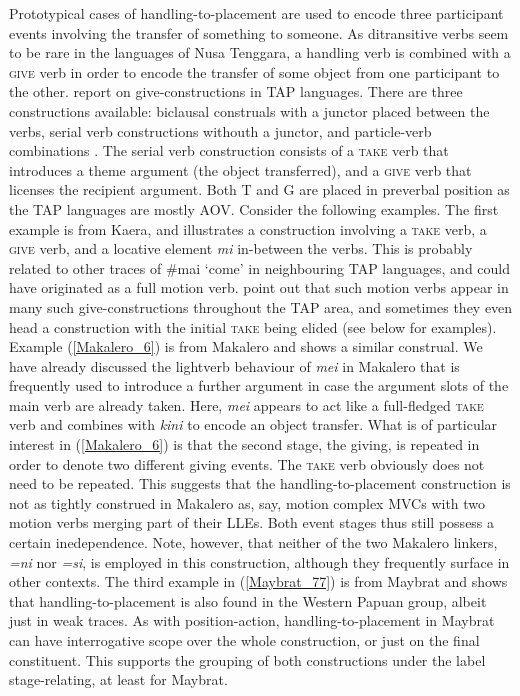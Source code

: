 Prototypical cases of handling-to-placement are used to encode three participant events involving the transfer of something to someone. As ditransitive verbs seem to be rare in the languages of Nusa Tenggara, a handling verb is combined with a \textsc{give} verb in order to encode the transfer of some object from one participant to the other. \citet{klamer2012development} report on give-constructions in TAP languages. There are three constructions available: biclausal construals with a junctor placed between the verbs, serial verb constructions withouth a junctor, and particle-verb combinations \citep{klamer2012development}. The serial verb construction consists of a \textsc{take} verb that introduces a theme argument (the object transferred), and a \textsc{give} verb that licenses the recipient argument. Both T and G are placed in preverbal position as the TAP languages are mostly AOV. Consider the following examples. The first example is from Kaera, and illustrates a construction involving a \textsc{take} verb, a \textsc{give} verb, and a locative element \textit{mi} in-between the verbs. This is probably related to other traces of \#mai `come' in neighbouring TAP languages, and could have originated as a full motion verb. \citet{klamer2012development} point out that such motion verbs appear in many such give-constructions throughout the TAP area, and sometimes they even head a construction with the initial \textsc{take} being elided (see below for examples). Example (\ref{Makalero_6}) is from Makalero and shows a similar construal. We have already discussed the lightverb behaviour of \textit{mei} in Makalero that is frequently used to introduce a further argument in case the argument slots of the main verb are already taken. Here, \textit{mei} appears to act like a full-fledged \textsc{take} verb and combines with \textit{kini} to encode an object transfer. What is of particular interest in (\ref{Makalero_6}) is that the second stage, the giving, is repeated in order to denote two different giving events. The \textsc{take} verb obviously does not need to be repeated. This suggests that the handling-to-placement construction is not as tightly construed in Makalero as, say, motion complex MVCs with two motion verbs merging part of their LLEs. Both event stages thus still possess a certain inedependence. Note, however, that neither of the two Makalero linkers, \textit{=ni} nor \textit{=si}, is employed in this construction, although they frequently surface in other contexts. The third example in (\ref{Maybrat_77}) is from Maybrat and shows that handling-to-placement is also found in the Western Papuan group, albeit just in weak traces. As with position-action, handling-to-placement in Maybrat can have interrogative scope over the whole construction, or just on the final constituent. This supports the grouping of both constructions under the label stage-relating, at least for Maybrat. 

